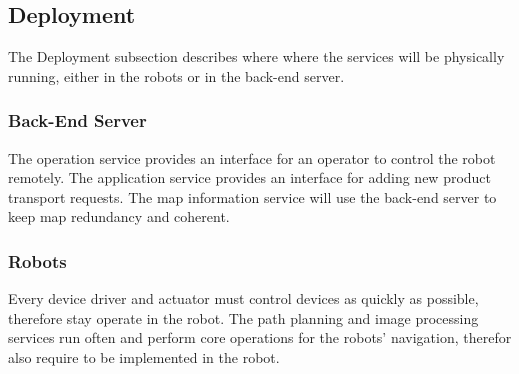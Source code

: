 \subsection{Deployment}
The Deployment subsection describes where where the services will be physically running, either in the robots or in the back-end server. 

\subsubsection{Back-End Server}
The operation service provides an interface for an operator to control the robot remotely. 
The application service provides an interface for adding new product transport requests.
The map information service will use the back-end server to keep map redundancy and coherent.

\subsubsection{Robots}
Every device driver and actuator must control devices as quickly as possible, therefore stay operate in the robot.
The path planning and image processing services run often and perform core operations for the robots' navigation, therefor also require to be implemented in the robot.
